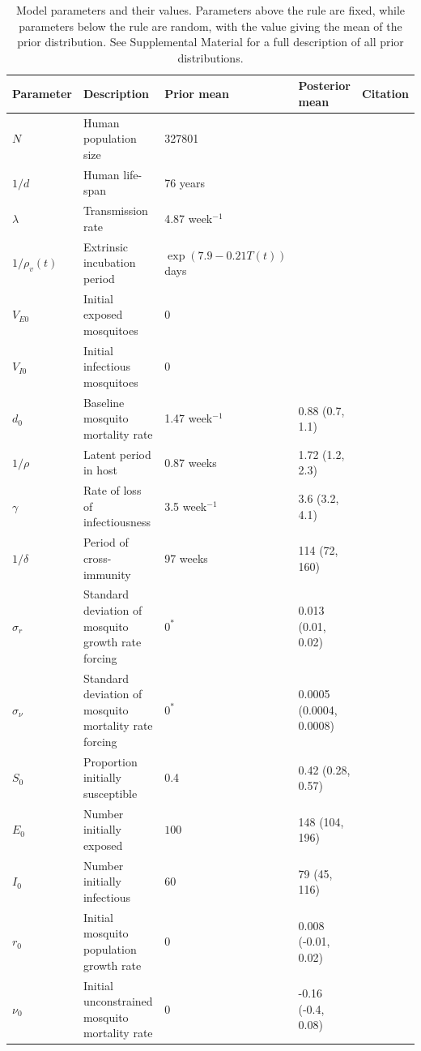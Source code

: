 \documentclass[10pt,letterpaper]{article}
\begin{document}
\begin{table}[!ht]
\label{parameters}
\begin{adjustwidth}{-2.25in}{0in} 
\begin{center}
\caption{Model parameters and their values.  Parameters above the rule are fixed, while parameters below the rule are random, with the value giving the mean of the prior distribution. See Supplemental Material for a full description of all prior distributions.}
\begin{tabular}{lp{6cm}lll}
Parameter & Description & Prior mean & Posterior mean & Citation\\
\hline
$N$ & Human population size & 327801 & & \cite{vitpop} \\
$1/d$ & Human life-span & 76 years & &\cite{vitlong} \\
$\lambda$ & Transmission rate & 4.87 week$^{-1}$ & & \cite{Scott2000}\\
$1/\rho_{v}(t)$ & Extrinsic incubation period & $\exp\left(7.9 - 0.21 T(t) \right)$ days & & \cite{Chan2012}\\
$V_{E0}$ & Initial exposed mosquitoes &  0 & &\\
$V_{I0}$ & Initial infectious mosquitoes & 0 & &\\
\hline
$d_0$ & Baseline mosquito mortality rate & 1.47 week$^{-1}$ & 0.88 (0.7, 1.1) &  \cite{Brady2013} \\
$1/\rho$ & Latent period in host & 0.87 weeks  & 1.72 (1.2, 2.3) &  \cite{Chan2012}\\
$\gamma$ & Rate of loss of infectiousness & 3.5 week$^{-1}$ & 3.6 (3.2, 4.1) & \cite{Nguyet2013}\\
$1/\delta$ & Period of cross-immunity & 97 weeks &  114 (72, 160) & \cite{Reich2013}\\
$\sigma_r$ & Standard deviation of mosquito growth rate forcing & $0^*$ & 0.013 (0.01, 0.02) &\\
$\sigma_{\nu}$ & Standard deviation of mosquito mortality rate forcing & $0^*$ & 0.0005 (0.0004, 0.0008) & \\
$S_0$ & Proportion initially susceptible & 0.4 & 0.42 (0.28, 0.57)& \cite{Cardoso2011a} \\
$E_0$ & Number initially exposed & $100$ & 148 (104, 196) & \\
$I_0$ & Number initially infectious & $60$ & 79 (45, 116) &\\
$r_0$ & Initial mosquito population growth rate & 0 & 0.008 (-0.01, 0.02) &\\
$\nu_0$ & Initial unconstrained mosquito mortality rate & 0 & -0.16 (-0.4, 0.08) &\\

\end{tabular}
\end{center}
\end{adjustwidth}
\end{table}
\end{document}
